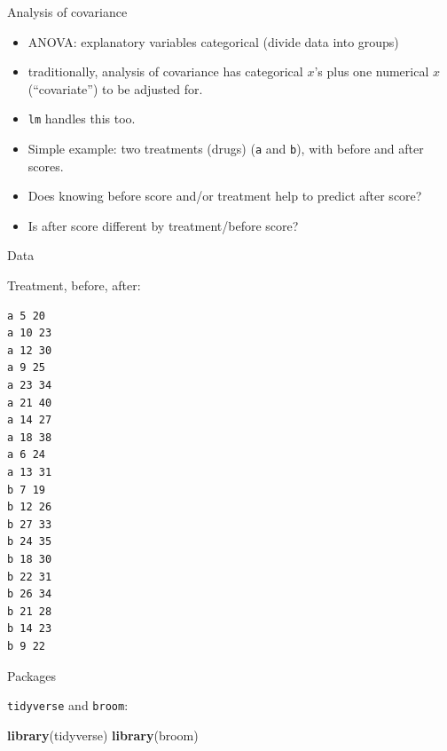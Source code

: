 \documentclass[ignorenonframetext,]{beamer}
\newenvironment{Shaded}{\begin{snugshade}}{\end{snugshade}}
\newcommand{\KeywordTok}[1]{\textcolor[rgb]{0.13,0.29,0.53}{\textbf{#1}}}
\newcommand{\NormalTok}[1]{#1}
\begin{document}
\begin{frame}[fragile]{Analysis of covariance}
\protect\hypertarget{analysis-of-covariance-1}{}

\begin{itemize}
\item
  ANOVA: explanatory variables categorical (divide data into groups)
\item
  traditionally, analysis of covariance has categorical \(x\)'s plus one
  numerical \(x\) (``covariate'') to be adjusted for.
\item
  \texttt{lm} handles this too.
\item
  Simple example: two treatments (drugs) (\texttt{a} and \texttt{b}),
  with before and after scores.
\item
  Does knowing before score and/or treatment help to predict after
  score?
\item
  Is after score different by treatment/before score?
\end{itemize}

\end{frame}

\begin{frame}[fragile]{Data}
\protect\hypertarget{data-1}{}

Treatment, before, after:

\scriptsize

\begin{verbatim}
a 5 20
a 10 23
a 12 30
a 9 25
a 23 34
a 21 40
a 14 27
a 18 38
a 6 24
a 13 31
b 7 19
b 12 26
b 27 33
b 24 35
b 18 30
b 22 31
b 26 34
b 21 28
b 14 23
b 9 22
\end{verbatim}

\normalsize

\end{frame}

\begin{frame}[fragile]{Packages}
\protect\hypertarget{packages-3}{}

\texttt{tidyverse} and \texttt{broom}:

\begin{Shaded}
\begin{Highlighting}[]
\KeywordTok{library}\NormalTok{(tidyverse)}
\KeywordTok{library}\NormalTok{(broom)}
\end{Highlighting}
\end{Shaded}

\end{frame}
\end{document}
